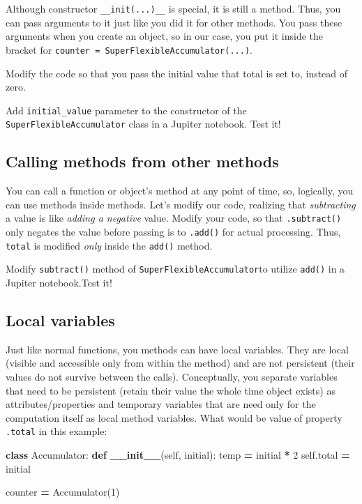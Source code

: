 \documentclass[
]{book}
\newenvironment{Shaded}{\begin{snugshade}}{\end{snugshade}}
\newcommand{\DecValTok}[1]{\textcolor[rgb]{0.00,0.00,0.81}{#1}}
\newcommand{\FunctionTok}[1]{\textcolor[rgb]{0.13,0.29,0.53}{\textbf{#1}}}
\newcommand{\KeywordTok}[1]{\textcolor[rgb]{0.13,0.29,0.53}{\textbf{#1}}}
\newcommand{\NormalTok}[1]{#1}
\newcommand{\OperatorTok}[1]{\textcolor[rgb]{0.81,0.36,0.00}{\textbf{#1}}}
\newcommand{\VariableTok}[1]{\textcolor[rgb]{0.00,0.00,0.00}{#1}}
\begin{document}
Although constructor \texttt{\_\_init(...)\_\_} is special, it is still a method. Thus, you can pass arguments to it just like you did it for other methods. You pass these arguments when you create an object, so in our case, you put it inside the bracket for \texttt{counter\ =\ SuperFlexibleAccumulator(...)}.

Modify the code so that you pass the initial value that total is set to, instead of zero.

Add \texttt{initial\_value} parameter to the constructor of the \texttt{SuperFlexibleAccumulator} class in a Jupiter notebook. Test it!

\hypertarget{calling-methods-from-other-methods}{%
\subsection{Calling methods from other methods}\label{calling-methods-from-other-methods}}

You can call a function or object's method at any point of time, so, logically, you can use methods inside methods. Let's modify our code, realizing that \emph{subtracting} a value is like \emph{adding a negative} value. Modify your code, so that \texttt{.subtract()} only negates the value before passing is to \texttt{.add()} for actual processing. Thus, \texttt{total} is modified \emph{only} inside the \texttt{add()} method.

Modify \texttt{subtract()} method of \texttt{SuperFlexibleAccumulator}to utilize \texttt{add()} in a Jupiter notebook.Test it!

\hypertarget{local-variables}{%
\subsection{Local variables}\label{local-variables}}

Just like normal functions, you methods can have local variables. They are local (visible and accessible only from within the method) and are not persistent (their values do not survive between the calls). Conceptually, you separate variables that need to be persistent (retain their value the whole time object exists) as attributes/properties and temporary variables that are need only for the computation itself as local method variables. What would be value of property \texttt{.total} in this example:

\begin{Shaded}
\begin{Highlighting}[]
\KeywordTok{class}\NormalTok{ Accumulator:}
    \KeywordTok{def} \FunctionTok{\_\_init\_\_}\NormalTok{(}\VariableTok{self}\NormalTok{, initial):}
\NormalTok{        temp }\OperatorTok{=}\NormalTok{ initial }\OperatorTok{*} \DecValTok{2}
        \VariableTok{self}\NormalTok{.total }\OperatorTok{=}\NormalTok{ initial}
        
\NormalTok{counter }\OperatorTok{=}\NormalTok{ Accumulator(}\DecValTok{1}\NormalTok{)}
\end{Highlighting}
\end{Shaded}
\end{document}
